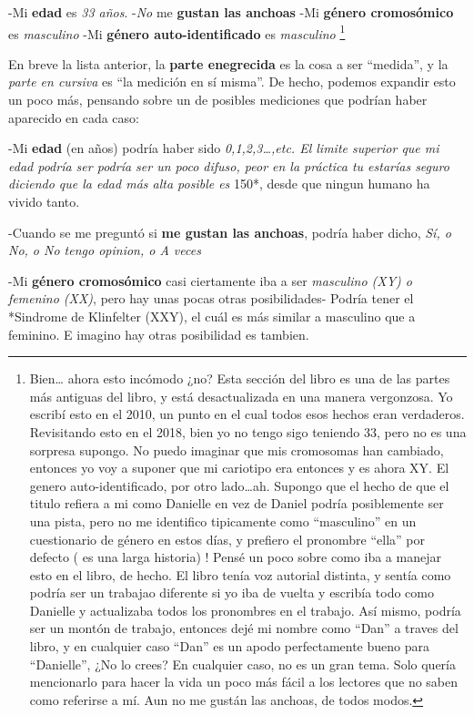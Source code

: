 \documentclass[]{book}
\begin{document}
-Mi \textbf{edad} es \emph{33 años}.
-\emph{No} me \textbf{gustan las anchoas}
-Mi \textbf{género cromosómico} es \emph{masculino}
-Mi \textbf{género auto-identificado} es \emph{masculino} \footnote{Bien\ldots{} ahora esto incómodo ¿no? Esta sección del libro es una de las partes más antiguas del libro, y está desactualizada en una manera
  vergonzosa. Yo escribí esto en el 2010, un punto en el cual todos esos hechos eran verdaderos. Revisitando esto en el 2018, bien yo no tengo sigo
  teniendo 33, pero no es una sorpresa supongo. No puedo imaginar que mis cromosomas han cambiado, entonces yo voy a suponer que mi cariotipo
  era entonces y es ahora XY. El genero auto-identificado, por otro lado\ldots{}ah. Supongo que el hecho de que el titulo refiera a mi como Danielle
  en vez de Daniel podría posiblemente ser una pista, pero no me identifico tipicamente como ``masculino'' en un cuestionario de género en estos días,
  y prefiero el pronombre ``ella'' por defecto ( es una larga historia) ! Pensé un poco sobre como iba a manejar esto en el libro, de hecho. El libro tenía voz autorial
  distinta, y sentía como podría ser un trabajao diferente si yo iba de vuelta y escribía todo como Danielle y actualizaba todos los pronombres en el trabajo.
  Así mismo, podría ser un montón de trabajo, entonces dejé mi nombre como ``Dan'' a traves del libro, y en cualquier caso ``Dan'' es un apodo perfectamente
  bueno para ``Danielle'', ¿No lo crees? En cualquier caso, no es un gran tema. Solo quería mencionarlo para hacer la vida un poco más fácil a los lectores
  que no saben como referirse a mí. Aun no me gustán las anchoas, de todos modos.}

En breve la lista anterior, la \textbf{parte enegrecida} es la cosa a ser ``medida'', y la \emph{parte en cursiva} es ``la medición en sí misma''. De hecho,
podemos expandir esto un poco más, pensando sobre un de posibles mediciones que podrían haber aparecido en cada caso:

-Mi \textbf{edad} (en años) podría haber sido \emph{0,1,2,3\ldots{},etc. El limite superior que mi edad podría ser podría ser un poco difuso, peor en la práctica
tu estarías seguro diciendo que la edad más alta posible es }150*, desde que ningun humano ha vivido tanto.

-Cuando se me preguntó si \textbf{me gustan las anchoas}, podría haber dicho, \emph{Sí, o No, o No tengo opinion, o A veces}

-Mi \textbf{género cromosómico} casi ciertamente iba a ser \emph{masculino (XY) o femenino (XX)}, pero hay unas pocas otras posibilidades- Podría tener el *Sindrome de
Klinfelter (XXY), el cuál es más similar a masculino que a feminino. E imagino hay otras posibilidad es tambien.
\end{document}
